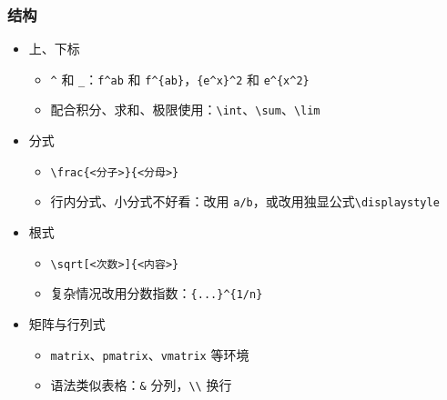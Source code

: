 \begin{frame}[fragile]
    \frametitle{结构}
    \begin{itemize}
        \item<+-> 上、下标
            \begin{itemize}
                \item \verb|^| 和 \verb|_|：\verb|f^ab| 和 \verb|f^{ab}|，\verb|{e^x}^2| 和 \verb|e^{x^2}|
                \item 配合积分、求和、极限使用：\verb|\int|、\verb|\sum|、\verb|\lim|
            \end{itemize}
        \item<+-> 分式
            \begin{itemize}
                \item \verb|\frac{<分子>}{<分母>}|
                \item 行内分式、小分式不好看：改用 \verb|a/b|，或改用独显公式\verb|\displaystyle|
            \end{itemize}
        \item<+-> 根式
            \begin{itemize}
                \item \verb|\sqrt[<次数>]{<内容>}|
                \item 复杂情况改用分数指数：\verb|{...}^{1/n}|
            \end{itemize}
        \item<+-> 矩阵与行列式
            \begin{itemize}
                \item \verb|matrix|、\verb|pmatrix|、\verb|vmatrix| 等环境
                \item 语法类似表格：\verb|&| 分列，\verb|\\| 换行
            \end{itemize}
    \end{itemize}
\end{frame}

